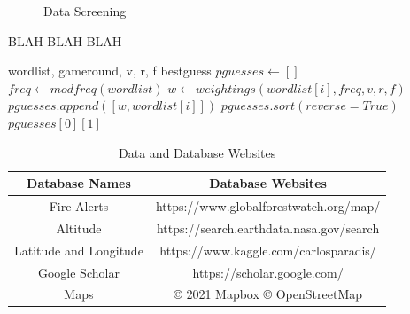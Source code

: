 \documentclass[12pt]{article}  %
\begin{document}
\begin{figure}[htbp]
    \centering    
	\caption{Data Screening} %
\end{figure}

\begin{algorithm}
	\caption{BLAH BLAH BLAH}
	\begin{algorithmic}[1] %
		\REQUIRE wordlist, gameround, v, r, f
		\ENSURE bestguess
		\STATE $pguesses \gets []$
		\STATE $freq \gets modfreq(wordlist)$
		\STATE $w \gets weightings(wordlist[i], freq, v, r, f)$
		\STATE $pguesses.append([w, wordlist[i]])$
		\ENDFOR
		\STATE $pguesses.sort(reverse = True)$
		\RETURN $pguesses[0][1]$
	\end{algorithmic}
\end{algorithm}


\begin{table}[htbp]
	\begin{center}
		\caption{Data and Database Websites}
		\resizebox{\textwidth}{!}
		{\begin{tabular}{c c}
				\toprule[2pt]
				\multicolumn{1}{m{5cm}}{\centering \textbf{Database Names}}
				&\multicolumn{1}{m{10cm}}{\centering \textbf{Database Websites} }\\ %
				\midrule
				Fire Alerts& https://www.globalforestwatch.org/map/ \\
				Altitude & https://search.earthdata.nasa.gov/search \\
				Latitude and Longitude & https://www.kaggle.com/carlosparadis/\\ 
				Google Scholar & https://scholar.google.com/ \\
				Maps& \copyright{} 2021 Mapbox \copyright{} OpenStreetMap\\
				\bottomrule[2pt]
		\end{tabular}}
	\end{center}
\end{table}
\end{document}
